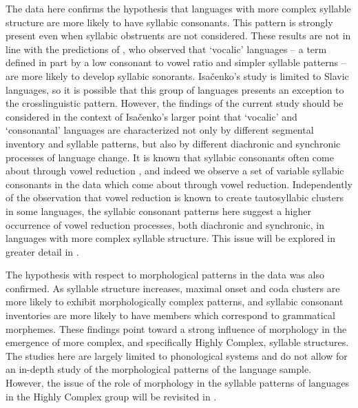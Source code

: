 The data here confirms the hypothesis that languages with more complex syllable structure are more likely to have syllabic consonants. This pattern is strongly present even when syllabic obstruents are not considered. These results are not in line with the predictions of \citet{Isačenko1939/1940}, who observed that ‘vocalic’ languages -- a term defined in part by a low consonant to vowel ratio and simpler syllable patterns -- are more likely to develop syllabic sonorants. Isačenko’s study is limited to Slavic languages, so it is possible that this group of languages presents an exception to the crosslinguistic pattern. However, the findings of the current study should be considered in the context of Isačenko’s larger point that ‘vocalic’ and ‘consonantal’ languages are characterized not only by different segmental inventory and syllable patterns, but also by different diachronic and synchronic processes of language change. It is known that syllabic consonants often come about through vowel reduction \citep{Bell1978a}, and indeed we observe a set of variable syllabic consonants in the data which come about through vowel reduction. Independently of the observation that vowel reduction is known to create tautosyllabic clusters in some languages, the syllabic consonant patterns here suggest a higher occurrence of vowel reduction processes, both diachronic and synchronic, in languages with more complex syllable structure. This issue will be explored in greater detail in .

The hypothesis with respect to morphological patterns in the data was also confirmed. As syllable structure increases, maximal onset and coda clusters are more likely to exhibit morphologically complex patterns, and syllabic consonant inventories are more likely to have members which correspond to grammatical morphemes. These findings point toward a strong influence of morphology in the emergence of more complex, and specifically Highly Complex, syllable structures. The studies here are largely limited to phonological systems and do not allow for an in-depth study of the morphological patterns of the language sample. However, the issue of the role of morphology in the syllable patterns of languages in the Highly Complex group will be revisited in .

